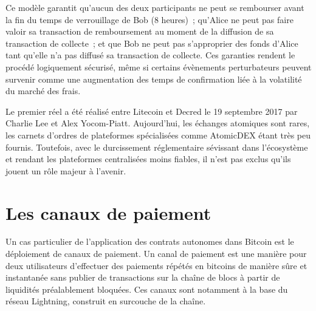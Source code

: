 Ce modèle garantit qu'aucun des deux participants ne peut se rembourser avant la fin du temps de verrouillage de Bob (8 heures)~; qu'Alice ne peut pas faire valoir sa transaction de remboursement au moment de la diffusion de sa transaction de collecte~; et que Bob ne peut pas s'approprier des fonds d'Alice tant qu'elle n'a pas diffusé sa transaction de collecte. Ces garanties rendent le procédé logiquement sécurisé, même si certains évènements perturbateurs peuvent survenir comme une augmentation des temps de confirmation liée à la volatilité du marché des frais.

Le premier  réel a été réalisé entre Litecoin et Decred le 19 septembre 2017 par Charlie Lee et Alex Yocom-Piatt. Aujourd'hui, les échanges atomiques sont rares, les carnets d'ordres de plateformes spécialisées comme AtomicDEX étant très peu fournis. Toutefois, avec le durcissement réglementaire sévissant dans l'écosystème et rendant les plateformes centralisées moins fiables, il n'est pas exclus qu'ils jouent un rôle majeur à l'avenir.

\section*{Les canaux de paiement}

Un cas particulier de l'application des contrats autonomes dans Bitcoin est le déploiement de canaux de paiement. Un canal de paiement est une manière pour deux utilisateurs d'effectuer des paiements répétés en bitcoins de manière sûre et instantanée sans publier de transactions sur la chaîne de blocs à partir de liquidités préalablement bloquées. Ces canaux sont notamment à la base du réseau Lightning, construit en surcouche de la chaîne.


